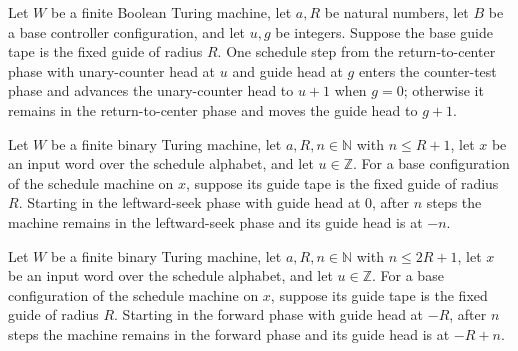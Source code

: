 \begin{lemma}
\label{Complexity.macroCfg_center}
\leanok
{}
Let $W$ be a finite Boolean Turing machine, let $a,R$ be natural numbers, let $B$ be a
base controller configuration, and let $u,g$ be integers. Suppose the base guide tape is
the fixed guide of radius $R$. One schedule step from the return-to-center phase with
unary-counter head at $u$ and guide head at $g$ enters the counter-test phase and
advances the unary-counter head to $u+1$ when $g=0$; otherwise it remains in the
return-to-center phase and moves the guide head to $g+1$.
\end{lemma}

\begin{lemma}
\label{Complexity.macroCfg_seek_run}
\leanok
{}
Let $W$ be a finite binary Turing machine, let $a,R,n\in\mathbb{N}$ with $n\le R+1$, let
$x$ be an input word over the schedule alphabet, and let $u\in\mathbb{Z}$. For a base
configuration of the schedule machine on $x$, suppose its guide tape is the fixed guide
of radius $R$. Starting in the leftward-seek phase with guide head at $0$, after $n$
steps the machine remains in the leftward-seek phase and its guide head is at $-n$.
\end{lemma}

\begin{lemma}
\label{Complexity.macroCfg_forward_run}
\leanok
{}
Let $W$ be a finite binary Turing machine, let $a,R,n\in\mathbb{N}$ with $n\le 2R+1$,
let $x$ be an input word over the schedule alphabet, and let $u\in\mathbb{Z}$. For a
base configuration of the schedule machine on $x$, suppose its guide tape is the fixed
guide of radius $R$. Starting in the forward phase with guide head at $-R$, after $n$
steps the machine remains in the forward phase and its guide head is at $-R+n$.
\end{lemma}

